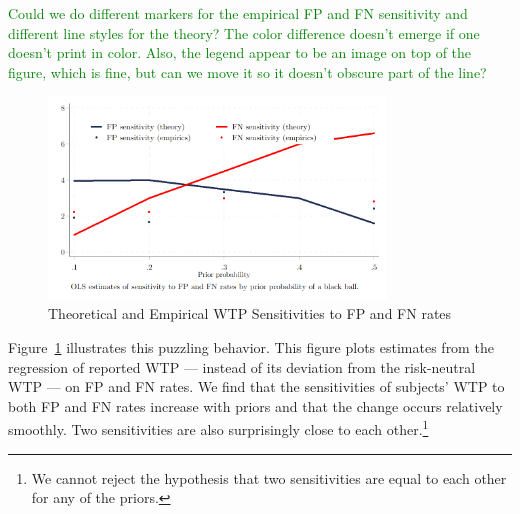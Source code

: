 \documentclass[12pt,a4paper]{article}
\begin{document}


\textcolor{green}{Could we do different markers for the empirical FP and FN sensitivity and different line styles for the theory? The color difference doesn't emerge if one doesn't print in color.  Also, the legend appear to be an image on top of the figure, which is fine, but can we move it so it doesn't obscure part of the line?}
\begin{figure}[H]
\centering
\caption{Theoretical and Empirical WTP Sensitivities to FP and FN rates} \label{fig:Comparison}
\includegraphics[width=0.8\textwidth]{Graphs/sensit_comparison.png}
\end{figure}

Figure~\ref{fig:Comparison} illustrates this puzzling behavior. This figure plots estimates from the regression of reported WTP --- instead of its deviation from the risk-neutral WTP --- on FP and FN rates. We find that the sensitivities of subjects' WTP to both FP and FN rates increase with priors and that the change occurs relatively smoothly. Two sensitivities are also surprisingly close to each other.\footnote{We cannot reject the hypothesis that two sensitivities are equal to each other for any of the priors.} 
\end{document}
